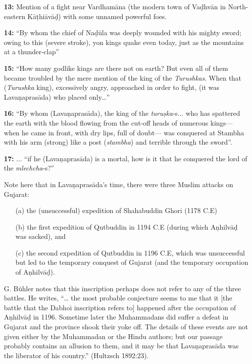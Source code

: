 \smallskip
\noindent
{\bf 13:} Mention of a fight near Vardhamāna (the modern town of Vaḍhvān in North-eastern Kāṭhiāvāḍ) with some unnamed powerful foes.

\smallskip
\noindent
{\bf 14:} “By whom the chief of Naḍūla was deeply wounded with his mighty sword; owing to this (severe stroke), yon kings quake even today, just as the mountains at a thunder-clap”

\smallskip
\noindent
{\bf 15:} “How many godlike kings are there not on earth? But even all of them became troubled by the mere mention of the king of the {\sl Turushkas}. When that ({\sl Turushka} king), excessively angry, approached in order to fight, (it was Lavaṇaprasāda) who placed only…”

\smallskip
\noindent
{\bf 16:} “By whom (Lavaṇaprasāda), the king of the {\sl turuṣka}-s... who has spattered the earth with the blood flowing from the cut-off heads of numerous kings— when he came in front, with dry lips, full of doubt— was conquered at Stambha with his arm (strong) like a post ({\sl stambha}) and terrible through the sword”.

\smallskip
\noindent
{\bf 17:} ... “if he (Lavaṇaprasāda) is a mortal, how is it that he conquered the lord of the {\sl mlechcha}-s?”

\smallskip
Note here that in Lavaṇaprasāda’s time, there were three Muslim attacks on Gujarat: 
\begin{itemize}
\item[(a)] the (unsuccessful) expedition of Shahabuddin Ghori  (1178 C.E) 
\item[(b)] the first expedition of Qutbuddin in 1194 C.E (during which Aṇhilvāḍ was sacked), and 
\item[(c)] the second expedition of Qutbuddin in 1196 C.E, which was unsuccessful but led to the temporary conquest of Gujarat (and the temporary occupation of Aṇhilvāḍ). 
\end{itemize}
G. Bühler notes that this inscription perhaps does not refer to any of the three battles. He writes, “… the most probable conjecture seems to me that it [the battle that the Dabhoi inscription refers to] happened after the occupation of Aṇhilvāḍ in 1196. Sometime later the Muhammadans did suffer a defeat in Gujarat and the province shook their yoke off. The details of these events are not given either by the Muhammadan or the Hindu authors; but our passage probably contains an allusion to them, and it may be that Lavaṇaprasāda was the liberator of his country.” (Hultzsch 1892:23). 

